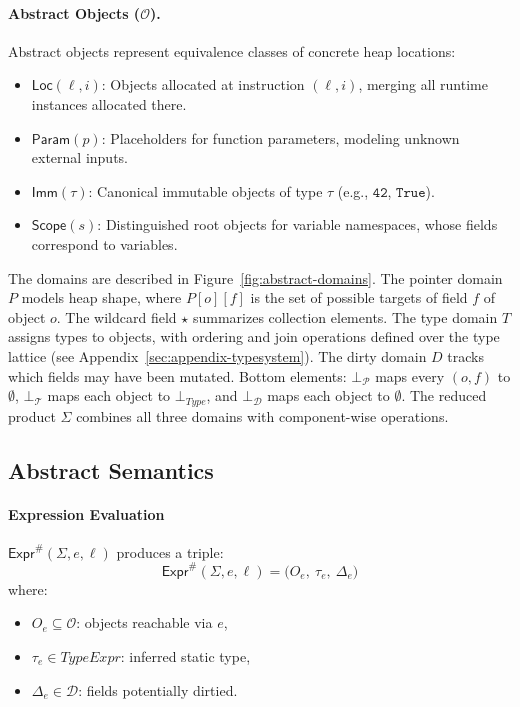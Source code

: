\paragraph{Abstract Objects (\(\mathcal{O}\)).}
Abstract objects represent equivalence classes of concrete heap locations:
\begin{itemize}
    \item \(\mathsf{Loc}(\ell,i)\): Objects allocated at instruction \((\ell,i)\), merging all runtime instances allocated there.
    \item \(\mathsf{Param}(p)\): Placeholders for function parameters, modeling unknown external inputs.
    \item \(\mathsf{Imm}(\tau)\): Canonical immutable objects of type \(\tau\) (e.g., \(\mathtt{42}\), \(\mathtt{True}\)).
    \item \(\mathsf{Scope}(s)\): Distinguished root objects for variable namespaces, whose fields correspond to variables.
\end{itemize}

The domains are described in Figure~\ref{fig:abstract-domains}. The pointer domain $P$ models heap shape, where $P[o][f]$ is the set of possible targets of field $f$ of object $o$. The wildcard field $\star$ summarizes collection elements. The type domain $T$ assigns types to objects, with ordering and join operations defined over the type lattice (see Appendix~\ref{sec:appendix-typesystem}). The dirty domain $D$ tracks which fields may have been mutated. Bottom elements: $\bot_\mathcal{P}$ maps every $(o,f)$ to $\emptyset$, $\bot_{\mathcal{T}}$ maps each object to $\bot_{\mathit{Type}}$, and $\bot_\mathcal{D}$ maps each object to $\emptyset$. The reduced product $\Sigma$ combines all three domains with component-wise operations.

\subsection{Abstract Semantics}

\paragraph{Expression Evaluation} \(\mathsf{Expr}^\#(\Sigma, e, \ell)\) produces a triple:
\[
\mathsf{Expr}^\#(\Sigma, e, \ell) = \big(O_e,\ \tau_e,\ \Delta_e\big)
\]
where:
\begin{itemize}
    \item \(O_e \subseteq \mathcal{O}\): objects reachable via \(e\),
    \item \(\tau_e \in \mathit{TypeExpr}\): inferred static type,
    \item \(\Delta_e \in \mathcal{D}\): fields potentially dirtied.
\end{itemize}

